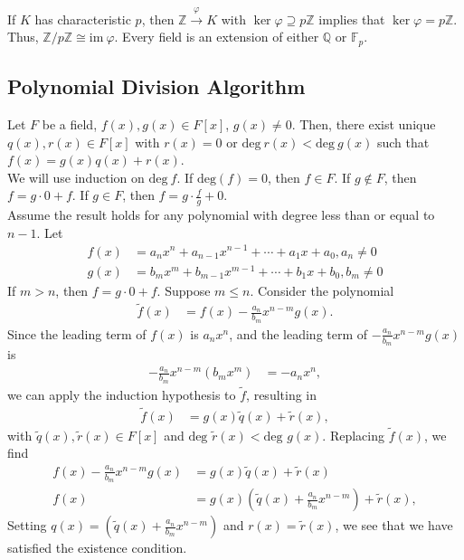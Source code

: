 \documentclass[8pt]{extarticle}
\newcommand{\Q}{\mathbb{Q}}
\newcommand{\Z}{\mathbb{Z}}
\begin{document}
  If $K$ has characteristic $p$, then $\Z\xrightarrow{\varphi}K$ with $\ker\varphi \supseteq p\Z$ implies that $\ker\varphi = p\Z$. Thus, $\Z/p\Z\cong \text{im}~\varphi$. Every field is an extension of either $\Q$ or $\mathbb{F}_p$.
  \subsection{Polynomial Division Algorithm}%
  Let $F$ be a field, $f(x),g(x)\in F[x]$, $g(x)\neq 0$. Then, there exist unique $q(x),r(x)\in F[x]$ with $r(x) = 0$ or $\text{deg}~r(x) < \text{deg}~g(x)$ such that $f(x) = g(x)q(x) + r(x)$.\\

  We will use induction on $\text{deg}~f$. If $\text{deg}(f) = 0$, then $f\in F$. If $g\notin F$, then $f = g\cdot 0 + f$. If $g\in F$, then $f = g \cdot \frac{f}{g} + 0$.\\

  Assume the result holds for any polynomial with degree less than or equal to $n-1$. Let
  \begin{align*}
    f(x) &= a_nx^n + a_{n-1}x^{n-1} + \cdots + a_1x + a_0,a_n\neq 0\\
    g(x) &= b_mx^m + b_{m-1}x^{m-1} + \cdots + b_1 x + b_0, b_m\neq 0
  \end{align*}
  If $m > n$, then $f = g\cdot 0 + f$. Suppose $m\leq n$. Consider the polynomial
  \begin{align*}
    \tilde{f}(x) &= f(x) - \frac{a_n}{b_m}x^{n-m}g(x).
  \end{align*}
  Since the leading term of $f(x)$ is $a_nx^n$, and the leading term of $-\frac{a_n}{b_m}x^{n-m}g(x)$ is 
  \begin{align*}
    -\frac{a_n}{b_m}x^{n-m}\left(b_mx^m\right) &= -a_nx^{n},
  \end{align*}
  we can apply the induction hypothesis to $\tilde{f}$, resulting in
  \begin{align*}
    \tilde{f}(x) &= g(x)\tilde{q}(x) + \tilde{r}(x),
  \end{align*}
  with $\tilde{q}(x),\tilde{r}(x) \in F[x]$ and $\text{deg }\tilde{r}(x) < \text{deg }g(x)$. Replacing $\tilde{f}(x)$, we find
  \begin{align*}
    f(x) - \frac{a_n}{b_m}x^{n-m}g(x) &= g(x)\tilde{q}(x) + \tilde{r}(x)\\
    f(x) &= g(x)\left(\tilde{q}(x) + \frac{a_n}{b_m}x^{n-m}\right) + \tilde{r}(x),
  \end{align*}
  Setting $q(x) = \left(\tilde{q}(x) + \frac{a_n}{b_m}x^{n-m}\right)$ and $r(x) = \tilde{r}(x)$, we see that we have satisfied the existence condition.
\end{document}
